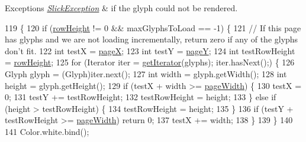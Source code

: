 \begin{DoxyExceptions}{Exceptions}
{\em \mbox{\hyperlink{classorg_1_1newdawn_1_1slick_1_1_slick_exception}{Slick\+Exception}}} & if the glyph could not be rendered. \\
\hline
\end{DoxyExceptions}

\begin{DoxyCode}
119                                                                                    \{
120         \textcolor{keywordflow}{if} (\mbox{\hyperlink{classorg_1_1newdawn_1_1slick_1_1font_1_1_glyph_page_a98ef737403aa53fed93e68e08117ec39}{rowHeight}} != 0 && maxGlyphsToLoad == -1) \{
121             \textcolor{comment}{// If this page has glyphs and we are not loading incrementally, return zero if any of the
       glyphs don't fit.}
122             \textcolor{keywordtype}{int} testX = \mbox{\hyperlink{classorg_1_1newdawn_1_1slick_1_1font_1_1_glyph_page_a6d1de13b49bd950e136d250a37eee4eb}{pageX}};
123             \textcolor{keywordtype}{int} testY = \mbox{\hyperlink{classorg_1_1newdawn_1_1slick_1_1font_1_1_glyph_page_a94b7aa9b91e5227a58e8f416ffe0fbaa}{pageY}};
124             \textcolor{keywordtype}{int} testRowHeight = \mbox{\hyperlink{classorg_1_1newdawn_1_1slick_1_1font_1_1_glyph_page_a98ef737403aa53fed93e68e08117ec39}{rowHeight}};
125             \textcolor{keywordflow}{for} (Iterator iter = \mbox{\hyperlink{classorg_1_1newdawn_1_1slick_1_1font_1_1_glyph_page_a7803412d2be72ebd03d1dee29f571770}{getIterator}}(glyphs); iter.hasNext();) \{
126                 Glyph glyph = (Glyph)iter.next();
127                 \textcolor{keywordtype}{int} width = glyph.getWidth();
128                 \textcolor{keywordtype}{int} height = glyph.getHeight();
129                 \textcolor{keywordflow}{if} (testX + width >= \mbox{\hyperlink{classorg_1_1newdawn_1_1slick_1_1font_1_1_glyph_page_a92a417a19c115ae906499f7d8c026130}{pageWidth}}) \{
130                     testX = 0;
131                     testY += testRowHeight;
132                     testRowHeight = height;
133                 \} \textcolor{keywordflow}{else} \textcolor{keywordflow}{if} (height > testRowHeight) \{
134                     testRowHeight = height;
135                 \}
136                 \textcolor{keywordflow}{if} (testY + testRowHeight >= \mbox{\hyperlink{classorg_1_1newdawn_1_1slick_1_1font_1_1_glyph_page_a92a417a19c115ae906499f7d8c026130}{pageWidth}}) \textcolor{keywordflow}{return} 0;
137                 testX += width;
138             \}
139         \}
140 
141         Color.white.bind();

\end{DoxyCode}
